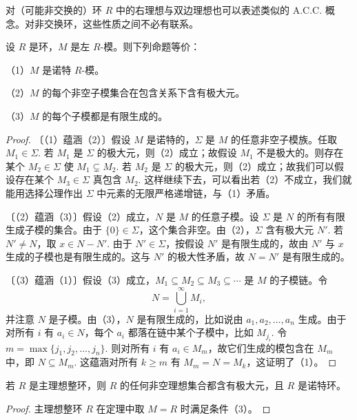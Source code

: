 对（可能非交换的）环 \(R\) 中的右理想与双边理想也可以表述类似的 A.C.C. 概念。对非交换环，这些性质之间不必有联系。

\begin{theorem}\label{thm:12.1}
设 \(R\) 是环，\(M\) 是左 \(R\)-模。则下列命题等价：

（1）\(M\) 是诺特 \(R\)-模。

（2）\(M\) 的每个非空子模集合在包含关系下含有极大元。

（3）\(M\) 的每个子模都是有限生成的。
\end{theorem}

\begin{proof}
〔（1）蕴涵（2）〕假设 \(M\) 是诺特的，\(\Sigma\) 是 \(M\) 的任意非空子模族。任取 \(M_1 \in \Sigma\). 若 \(M_1\) 是 \(\Sigma\) 的极大元，则（2）成立；故假设 \(M_1\) 不是极大的。则存在某个 \(M_2 \in \Sigma\) 使 \(M_1 \subsetneq M_2\). 若 \(M_2\) 是 \(\Sigma\) 的极大元，则（2）成立；故我们可以假设存在某个 \(M_3 \in \Sigma\) 真包含 \(M_2\). 这样继续下去，可以看出若（2）不成立，我们就能用选择公理作出 \(\Sigma\) 中元素的无限严格递增链，与（1）矛盾。

〔（2）蕴涵（3）〕假设（2）成立，\(N\) 是 \(M\) 的任意子模。设 \(\Sigma\) 是 \(N\) 的所有有限生成子模的集合。由于 \(\{0\} \in \Sigma\)，这个集合非空。由（2），\(\Sigma\) 含有极大元 \(N'\). 若 \(N' \neq N\)，取 \(x \in N-N'\). 由于 \(N' \in \Sigma\)，按假设 \(N'\) 是有限生成的，故由 \(N'\) 与 \(x\) 生成的子模也是有限生成的。这与 \(N'\) 的极大性矛盾，故 \(N = N'\) 是有限生成的。

〔（3）蕴涵（1）〕假设（3）成立，\(M_1 \subseteq M_2 \subseteq M_3 \subseteq \cdots\) 是 \(M\) 的子模链。令
\[
N = \bigcup_{i=1}^{\infty} M_i,
\]
并注意 \(N\) 是子模。由（3），\(N\) 是有限生成的，比如说由 \(a_1, a_2, \ldots, a_n\) 生成。由于对所有 \(i\) 有 \(a_i \in N\)，每个 \(a_i\) 都落在链中某个子模中，比如 \(M_{j_i}\). 令 \(m = \max\{j_1, j_2, \ldots, j_n\}\). 则对所有 \(i\) 有 \(a_i \in M_m\)，故它们生成的模包含在 \(M_m\) 中，即 \(N \subseteq M_m\). 这蕴涵对所有 \(k \geq m\) 有 \(M_m = N = M_k\)，这证明了（1）。
\end{proof}

\begin{corollary}\label{cor:12.2}
若 \(R\) 是主理想整环，则 \(R\) 的任何非空理想集合都含有极大元，且 \(R\) 是诺特环。
\end{corollary}

\begin{proof}
主理想整环 \(R\) 在定理中取 \(M = R\) 时满足条件（3）。
\end{proof}

